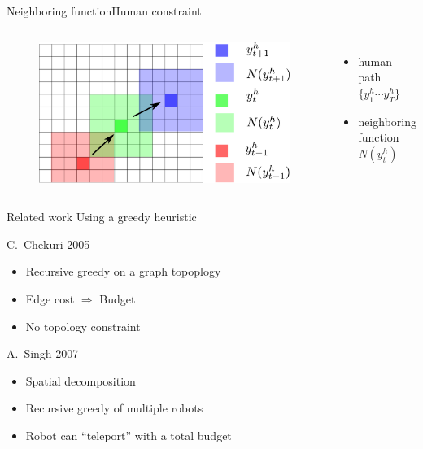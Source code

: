 \begin{frame}{Neighboring function}{Human constraint}
	\begin{columns}
		\begin{minipage}[c]{\linewidth}
			\begin{figure}
				\centering
				\includegraphics[width = \textwidth]{./figure/humanConstraint}
			\end{figure}
		\end{minipage}
		
		\begin{minipage}[c]{\linewidth}
			\begin{itemize}
				\item { human path $ \{ y^{h}_{1} \cdots y^{h}_{T} \} $ }
				\item { neighboring function $ N( y^{h}_{t} ) $ }
			\end{itemize}
		\end{minipage}
	\end{columns}
	
\end{frame}

\begin{frame}{Related work}{ Using a greedy heuristic}
\begin{block}{C.~Chekuri 2005\cite{1530718}}
\begin{itemize}
\item Recursive greedy on a graph topoplogy
\item Edge cost $ \Rightarrow $ Budget 
\item No topology constraint
\end{itemize}
\end{block}
\begin{block}{A.~Singh 2007\cite{singh2007efficient}}
\begin{itemize}
\item Spatial decomposition
\item Recursive greedy of multiple robots
\item Robot can ``teleport'' with a total budget
\end{itemize}
\end{block}
\end{frame}

